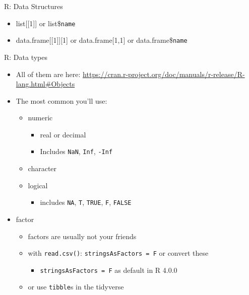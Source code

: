 \documentclass[
  ignorenonframetext,
]{beamer}
\providecommand{\tightlist}{%
  \setlength{\itemsep}{0pt}\setlength{\parskip}{0pt}}
\begin{document}
\begin{frame}[fragile]{R: Data Structures}
\protect\hypertarget{r-data-structures-2}{}

\begin{itemize}[<+->]
\tightlist
\item
  list{[}{[}1{]}{]} or list\$\texttt{name}
\item
  data.frame{[}{[}1{]}{]}{[}1{]} or data.frame{[}1,1{]} or
  data.frame\$\texttt{name}
\end{itemize}

\end{frame}

\begin{frame}[fragile]{R: Data types}
\protect\hypertarget{r-data-types}{}

\begin{itemize}[<+->]
\tightlist
\item
  All of them are here:
  \url{https://cran.r-project.org/doc/manuals/r-release/R-lang.html\#Objects}
\item
  The most common you'll use:

  \begin{itemize}[<+->]
  \tightlist
  \item
    numeric

    \begin{itemize}[<+->]
    \tightlist
    \item
      real or decimal
    \item
      Includes \texttt{NaN}, \texttt{Inf}, \texttt{-Inf}
    \end{itemize}
  \item
    character
  \item
    logical

    \begin{itemize}[<+->]
    \tightlist
    \item
      includes \texttt{NA}, \texttt{T}, \texttt{TRUE}, \texttt{F},
      \texttt{FALSE}
    \end{itemize}
  \end{itemize}
\item
  factor

  \begin{itemize}[<+->]
  \tightlist
  \item
    factors are usually not your friends
  \item
    with \texttt{read.csv()}: \texttt{stringsAsFactors\ =\ F} or convert
    these

    \begin{itemize}[<+->]
    \tightlist
    \item
      \texttt{stringsAsFactors\ =\ F} as default in R 4.0.0
    \end{itemize}
  \item
    or use \texttt{tibble}s in the tidyverse
  \end{itemize}
\end{itemize}

\end{frame}
\end{document}
